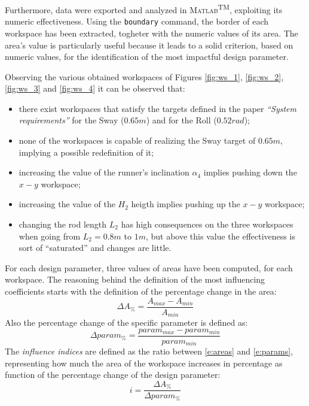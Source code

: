 \documentclass[10.5pt, twocolumn]{article}
\newcommand{\Virgolette}[1]{``#1''}
\begin{document}
Furthermore, data were exported and analyzed in \textsc{Matlab}\textsuperscript{TM}, exploiting its numeric effectiveness. Using the \texttt{boundary} command, the border of each workspace has been extracted, togheter with the numeric values of its area. The area's value is particularly useful because it leads to a solid criterion, based on numeric values, for the identification of the most impactful design parameter.

Observing the various obtained workspaces of Figures \ref{fig:ws_1}, \ref{fig:ws_2}, \ref{fig:ws_3} and \ref{fig:ws_4} it can be observed that:
\begin{itemize}
	\item there exist workspaces that satisfy the targets defined in the paper \textit{\Virgolette{System requirements}} for the Sway (\(0.65 m\)) and for the Roll (\(0.52 rad\));
	\item none of the workspaces is capable of realizing the Sway target of \(0.65 m\), implying a possible redefinition of it;
	\item increasing the value of the runner's inclination \(\alpha_4\) implies pushing down the \(x-y\) workspace;
	\item increasing the value of the \(H_2\) heigth implies pushing up the \(x-y\) workspace;
	\item changing the rod length \(L_2\) has high consequences on the three workspaces when going from \(L_2=0.8 m\) to \(1m\), but above this value the effectiveness is sort of \Virgolette{saturated} and changes are little.
\end{itemize}

For each design parameter, three values of areas have been computed, for each workspace. The reasoning behind the definition of the most influencing coefficients starts with the definition of the percentage change in the area:
\begin{equation}
  \label{e:areas}
  \Delta A_{\%} = \frac{A_{max} - A_{min}}{A_{min}}
\end{equation}
Also the percentage change of the specific parameter is defined as:
 \begin{equation}
   \label{e:params}
   \Delta param_{\%} = \frac{param_{max} - param_{min}}{param_{min}}
 \end{equation}
The \textit{influence indices} are defined as the ratio between \eqref{e:areas} and \eqref{e:params}, representing how much the area of the workspace increases in percentage as function of the percentage change of the design parameter:
  \begin{equation}
    \label{e:indices}
    i = \frac{\Delta A_{\%}}{\Delta param_{\%}}
  \end{equation}
\end{document}
